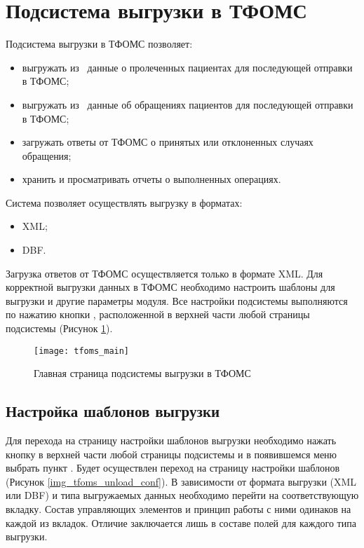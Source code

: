 \newpage
\section{Подсистема выгрузки в ТФОМС}

Подсистема выгрузки в ТФОМС позволяет:
\begin{itemize}
 \item 	выгружать из \tmis~данные о пролеченных пациентах для последующей отправки в ТФОМС;
 \item выгружать из \tmis~данные об обращениях пациентов для последующей отправки в ТФОМС;
 \item загружать ответы от ТФОМС о принятых или отклоненных случаях обращения;
 \item хранить и просматривать отчеты о выполненных операциях.
\end{itemize}
 
Система позволяет осуществлять выгрузку в форматах:
\begin{itemize}
 \item XML;
 \item DBF.
\end{itemize}
 
Загрузка ответов от ТФОМС осуществляется только в формате XML.
Для корректной выгрузки данных в ТФОМС необходимо настроить шаблоны для выгрузки и другие параметры модуля. Все настройки подсистемы выполняются по нажатию кнопки , расположенной в верхней части любой страницы подсистемы (Рисунок \ref{img_tfoms_main}).

\begin{figure}[ht]\centering
 \texttt{[image: tfoms\_main]}
 \caption{Главная страница подсистемы выгрузки в ТФОМС}
 \label{img_tfoms_main}
\end{figure}

\subsection{Настройка шаблонов выгрузки}

Для перехода на страницу настройки шаблонов выгрузки необходимо нажать кнопку   в верхней части любой страницы подсистемы и в появившемся меню выбрать пункт . Будет осуществлен переход на страницу настройки шаблонов (Рисунок \ref{img_tfoms_unload_conf}). В зависимости от формата выгрузки (XML или DBF) и типа выгружаемых данных необходимо перейти на соответствующую вкладку. Состав управляющих элементов и принцип работы с ними одинаков на каждой из вкладок. Отличие заключается лишь в составе полей для каждого типа выгрузки.

